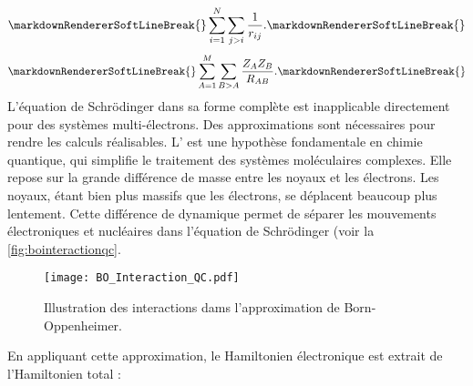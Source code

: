 \markdownRendererSoftLineBreak
{}\begin{equation}\markdownRendererSoftLineBreak
{}\sum_{i=1}^N \sum_{j>i} \frac{1}{r_{ij}} .\markdownRendererSoftLineBreak
{}\end{equation}\markdownRendererOlItemEnd 
{}\markdownRendererSoftLineBreak
{}\begin{equation}\markdownRendererSoftLineBreak
{}\sum_{A=1}^M \sum_{B>A} \frac{Z_A Z_B}{R_{AB}} .\markdownRendererSoftLineBreak
{}\end{equation}\markdownRendererOlItemEnd 
\markdownRendererOlEnd \markdownRendererInterblockSeparator
{}L'équation de Schrödinger dans sa forme complète est inapplicable directement pour des systèmes multi-électrons. Des approximations sont nécessaires pour rendre les calculs réalisables.\markdownRendererParagraphSeparator
{}
\markdownRendererSectionEnd \markdownRendererSectionBegin
{}\markdownRendererInterblockSeparator
{}L' est une hypothèse fondamentale en chimie quantique, qui simplifie le traitement des systèmes moléculaires complexes. Elle repose sur la grande différence de masse entre les noyaux et les électrons. Les noyaux, étant bien plus massifs que les électrons, se déplacent beaucoup plus lentement. Cette différence de dynamique permet de séparer les mouvements électroniques et nucléaires dans l’équation de Schrödinger (voir la \autoref{fig:bointeractionqc}.\markdownRendererParagraphSeparator
{}\begin{figure}[tbph]\markdownRendererSoftLineBreak
{}\centering\markdownRendererSoftLineBreak
{}\texttt{[image: BO\_Interaction\_QC.pdf]}\markdownRendererSoftLineBreak
{}\caption{Illustration des interactions dams l'approximation de Born-Oppenheimer.}\markdownRendererSoftLineBreak
{}\label{fig:bointeractionqc}\markdownRendererSoftLineBreak
{}\end{figure}\markdownRendererInterblockSeparator
{}\markdownRendererSectionBegin
{}\markdownRendererInterblockSeparator
{}En appliquant cette approximation, le Hamiltonien électronique est extrait de l'Hamiltonien total :\markdownRendererInterblockSeparator
{}\markdownRendererInterblockSeparator
